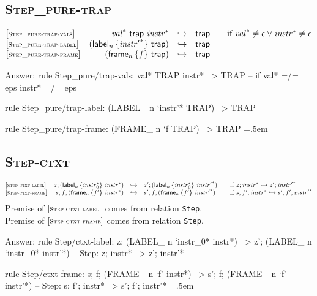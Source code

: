 \documentclass{article}
\newenvironment{lcverbatim}
 {\SaveVerbatim{cverb}}
 {\endSaveVerbatim
  \flushleft\fboxrule=0pt\fboxsep=.5em
  \colorbox{cverbbg}{%
    \makebox[\dimexpr\linewidth-2\fboxsep][l]{\BUseVerbatim{cverb}}%
  }
  \endflushleft
}
\newcommand\K[1]{\texttt{#1}}
\begin{document}
\subsection{\normalfont\normalsize\textsc {Step\_pure{-}trap}}
$$
\begin{array}{@{}l@{}rcl@{}l@{}}
	{[\textsc{\scriptsize Step\_pure{-}trap{-}vals}]} \quad & {{\mathit{val}}^\ast}~\mathsf{trap}~{{\mathit{instr}}^\ast} &\hookrightarrow& \mathsf{trap}
	&\qquad \mbox{if}~{{\mathit{val}}^\ast} \neq \epsilon \lor {{\mathit{instr}}^\ast} \neq \epsilon \\
	{[\textsc{\scriptsize Step\_pure{-}trap{-}label}]} \quad & ({\mathsf{label}}_{n}\,\{ {{\mathit{instr}'}^\ast} \}~\mathsf{trap}) &\hookrightarrow& \mathsf{trap} \\
	{[\textsc{\scriptsize Step\_pure{-}trap{-}frame}]} \quad & ({\mathsf{frame}}_{n}\,\{ f \}~\mathsf{trap}) &\hookrightarrow& \mathsf{trap} \\
\end{array}
$$
{\color{red}
	Answer:
	\begin{lcverbatim}
rule Step_pure/trap-vals:
  val* TRAP instr*  ~>  TRAP
  -- if val* =/= eps \/ instr* =/= eps

rule Step_pure/trap-label:
  (LABEL_ n `{instr'*} TRAP)  ~>  TRAP

rule Step_pure/trap-frame:
  (FRAME_ n `{f} TRAP)  ~>  TRAP
	\end{lcverbatim}
}

\subsection{\normalfont\normalsize\textsc {Step{-}ctxt}}
$$
\begin{array}{@{}l@{}rcl@{}l@{}}
	{[\textsc{\scriptsize Step{-}ctxt{-}label}]} \quad & z ; ({\mathsf{label}}_{n}\,\{ {{\mathit{instr}}_0^\ast} \}~{{\mathit{instr}}^\ast}) &\hookrightarrow& {z'} ; ({\mathsf{label}}_{n}\,\{ {{\mathit{instr}}_0^\ast} \}~{{\mathit{instr}'}^\ast})
	&\qquad \mbox{if}~z ; {{\mathit{instr}}^\ast} \hookrightarrow {z'} ; {{\mathit{instr}'}^\ast} \\
	{[\textsc{\scriptsize Step{-}ctxt{-}frame}]} \quad & s ; f ; ({\mathsf{frame}}_{n}\,\{ {f'} \}~{{\mathit{instr}}^\ast}) &\hookrightarrow& {s'} ; f ; ({\mathsf{frame}}_{n}\,\{ {f'} \}~{{\mathit{instr}'}^\ast})
	&\qquad \mbox{if}~s ; {f'} ; {{\mathit{instr}}^\ast} \hookrightarrow {s'} ; {f'} ; {{\mathit{instr}'}^\ast} \\
\end{array}
$$
Premise of $[\textsc{\scriptsize Step{-}ctxt{-}label}]$ comes from relation \K{Step}. \\
Premise of $[\textsc{\scriptsize Step{-}ctxt{-}frame}]$ comes from relation \K{Step}. \\
{\color{red}
	Answer:
	\begin{lcverbatim}
rule Step/ctxt-label:
  z; (LABEL_ n `{instr_0*} instr*)  ~>  z'; (LABEL_ n `{instr_0*} instr'*)
  -- Step: z; instr* ~> z'; instr'*

rule Step/ctxt-frame:
  s; f; (FRAME_ n `{f'} instr*)  ~>  s'; f; (FRAME_ n `{f'} instr'*)
  -- Step: s; f'; instr* ~> s'; f'; instr'*
	\end{lcverbatim}
}
\end{document}
